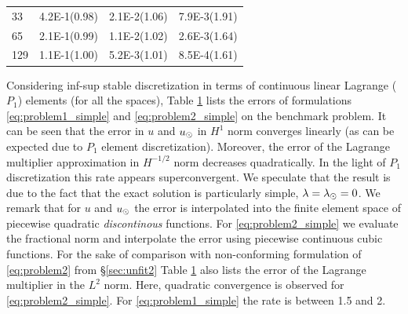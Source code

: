 \documentclass[r]{siamart171218}
\begin{document}
\begin{table}
{\begin{center}
\begin{tabular}{l|llll}
33  & 4.2E-1(0.98) & 2.1E-2(1.06) & \multicolumn{2}{c}{7.9E-3(1.91)}\\
65  & 2.1E-1(0.99) & 1.1E-2(1.02) & \multicolumn{2}{c}{2.6E-3(1.64)}\\
129 & 1.1E-1(1.00) & 5.2E-3(1.01) & \multicolumn{2}{c}{8.5E-4(1.61)}\\
\hline
    \end{tabular}
  \end{center}    
  }
  \label{tab:error_conform}
\end{table}

Considering inf-sup stable discretization in terms of continuous linear Lagrange
($P_1$) elements (for all the spaces), Table \ref{tab:error_conform}
lists the errors of formulations \eqref{eq:problem1_simple} and \eqref{eq:problem2_simple}
on the benchmark problem. It can be seen that the error in $u$ and $u_{\odot}$ in $H^1$ norm
converges linearly (as can be expected due to $P_1$ element discretization).
Moreover, the error of the Lagrange multiplier approximation in $H^{-1/2}$ norm
decreases quadratically. In the light of $P_1$ discretization this rate appears
superconvergent. We speculate that the result is due to the fact that the
exact solution is particularly simple, $\lambda=\lambda_{\odot}=0$.
We remark that for $u$ and $u_{\odot}$ the error is interpolated into the finite element space of
piecewise quadratic \emph{discontinous} functions. For \eqref{eq:problem2_simple} we
evaluate the fractional norm and interpolate the error using piecewise continuous
cubic functions. 
For the sake of comparison with non-conforming formulation of \eqref{eq:problem2} from
\S\ref{sec:unfit2} Table \ref{tab:error_conform} also
lists the error of the Lagrange multiplier in the $L^2$ norm. Here, quadratic convergence is observed
for \eqref{eq:problem2_simple}. For \eqref{eq:problem1_simple} the rate is between 1.5 and 2.
\end{document}
